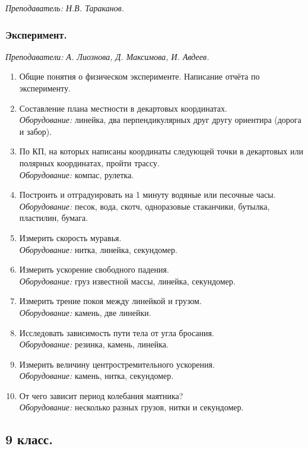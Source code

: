\documentclass[11pt]{article}
\newlength{\h}
\newlength{\x}
\begin{document}
\textit{Преподаватель: Н.В. Тараканов.}

\subsubsection{Эксперимент.}
\label{sec:exp8}

\textit{Преподаватели: А. Лиознова, Д. Максимова, И. Авдеев.}

\begin{enumerate}
\item Общие понятия о физическом эксперименте. Написание отчёта по
  эксперименту.
\item Составление плана местности в декартовых координатах.\\
  \textit{Оборудование:} линейка, два перпендикулярных друг другу
  ориентира (дорога и забор).
\item По КП, на которых написаны координаты следующей точки в
  декартовых или полярных координатах, пройти трассу.\\
  \textit{Оборудование:} компас, рулетка.
\item Построить и отградуировать на 1 минуту водяные или песочные
  часы. \\
  \textit{Оборудование:} песок, вода, скотч, одноразовые стаканчики,
  бутылка, пластилин, бумага.
\item Измерить скорость муравья.\\
  \textit{Оборудование:} нитка, линейка, секундомер.
\item Измерить ускорение свободного падения. \\
  \textit{Оборудование:} груз известной массы, линейка, секундомер.
\item Измерить трение покоя между линейкой и грузом. \\
  \textit{Оборудование:} камень, две линейки.
\item Исследовать зависимость пути тела от угла бросания. \\
  \textit{Оборудование:} резинка, камень, линейка.
\item Измерить величину центростремительного ускорения.\\
  \textit{Оборудование:} камень, нитка, секундомер.
\item От чего зависит период колебания маятника? \\
  \textit{Оборудование:} несколько разных грузов, нитки и секундомер.
\end{enumerate}

\subsection{9 класс.}
\label{sec:daily9}
\end{document}
